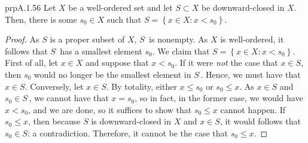 \begin{prp}{}{prpA.1.56}
Let $X$ be a well-ordered set and let $S\subset X$ be downward-closed in $X$.  Then, there is some $s_0\in X$ such that $S=\left\{ x\in X:x<s_0\right\}$.
\begin{proof}
As $S$ is a proper subset of $X$, $S^{\comp}$ is nonempty.  As $X$ is well-ordered, it follows that $S^{\comp}$ has a smallest element $s_0$.  We claim that $S=\left\{ x\in X:x<s_0\right\}$.  First of all, let $x\in X$ and suppose that $x<s_0$.  If it were \emph{not} the case that $x\in S$, then $s_0$ would no longer be the smallest element in $S^{\comp}$.  Hence, we must have that $x\in S$.  Conversely, let $x\in S$.  By totality, either $x\leq s_0$ or $s_0\leq x$.  As $x\in S$ and $s_0\in S^{\comp}$, we cannot have that $x=s_0$, so in fact, in the former case, we would have $x<s_0$, and we are done, so it suffices to show that $s_0\leq x$ cannot happen.  If $s_0\leq x$, then because $S$ is downward-closed in $X$ and $x\in S$, it would follows that $s_0\in S$:  a contradiction.  Therefore, it cannot be the case that $s_0\leq x$.
\end{proof}
\end{prp}
